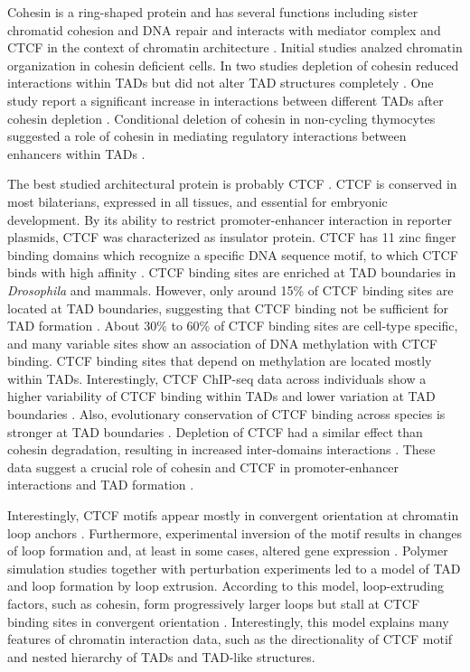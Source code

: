 \documentclass[a4paper,twoside=true,openright,parskip=full,chapterprefix=true,11pt,headings=normal,bibliography=totoc,listof=totoc,titlepage=on,captions=tableabove,draft=false]{scrreprt}
\theoremstyle{definition}
\theoremstyle{definition}
\theoremstyle{definition}
\theoremstyle{remark}
\begin{document}
Cohesin is a ring-shaped protein and has several functions including
sister chromatid cohesion and DNA repair and interacts with mediator
complex and CTCF in the context of chromatin architecture
\citep{Bonev2016, Merkenschlager2016}. Initial studies analzed chromatin
organization in cohesin deficient cells. In two studies depletion of
cohesin reduced interactions within TADs but did not alter TAD
structures completely \citep{Seitan2013, Zuin2014}. One study report a
significant increase in interactions between different TADs after
cohesin depletion \citep{Sofueva2013}. Conditional deletion of cohesin
in non-cycling thymocytes suggested a role of cohesin in mediating
regulatory interactions between enhancers within TADs
\citep{Ing-simmons2015}.

The best studied architectural protein is probably CTCF \citep{Ong2014}.
CTCF is conserved in most bilaterians, expressed in all tissues, and
essential for embryonic development. By its ability to restrict
promoter-enhancer interaction in reporter plasmids, CTCF was
characterized as insulator protein. CTCF has 11 zinc finger binding
domains which recognize a specific DNA sequence motif, to which CTCF
binds with high affinity \citep{Kim2007, Nagy2016}. CTCF binding sites
are enriched at TAD boundaries in \emph{Drosophila} and mammals.
However, only around 15\% of CTCF binding sites are located at TAD
boundaries, suggesting that CTCF binding not be sufficient for TAD
formation \citep{Bonev2016}. About 30\% to 60\% of CTCF binding sites
are cell-type specific, and many variable sites show an association of
DNA methylation with CTCF binding. CTCF binding sites that depend on
methylation are located mostly within TADs. Interestingly, CTCF ChIP-seq
data across individuals show a higher variability of CTCF binding within
TADs and lower variation at TAD boundaries \citep{Ruiz-Velasco2017}.
Also, evolutionary conservation of CTCF binding across species is
stronger at TAD boundaries \citep{VietriRudan2015}. Depletion of CTCF
had a similar effect than cohesin degradation, resulting in increased
inter-domains interactions \citep{Seitan2013, Zuin2014}. These data
suggest a crucial role of cohesin and CTCF in promoter-enhancer
interactions and TAD formation \citep{Pombo2015, Merkenschlager2016}.

Interestingly, CTCF motifs appear mostly in convergent orientation at
chromatin loop anchors \citep{Rao2014, Tang2015, VietriRudan2015}.
Furthermore, experimental inversion of the motif results in changes of
loop formation and, at least in some cases, altered gene expression
\citep{Guo2015, deWit2015, Sanborn2015}. Polymer simulation studies
together with perturbation experiments led to a model of TAD and loop
formation by loop extrusion. According to this model, loop-extruding
factors, such as cohesin, form progressively larger loops but stall at
CTCF binding sites in convergent orientation
\citep{Sanborn2015, Fudenberg2016}. Interestingly, this model explains
many features of chromatin interaction data, such as the directionality
of CTCF motif and nested hierarchy of TADs and TAD-like structures.
\end{document}

